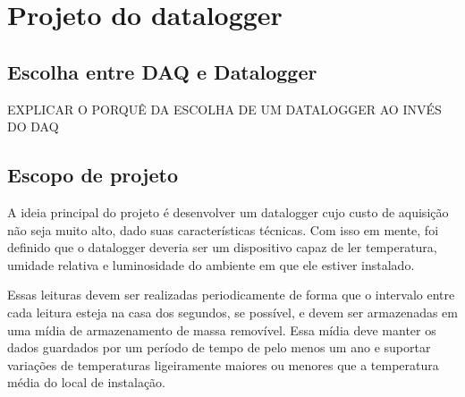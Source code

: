 \chapter{Projeto do datalogger}
\label{chap:metodologia}


\section{Escolha entre DAQ e Datalogger}




EXPLICAR O PORQUÊ DA ESCOLHA DE UM DATALOGGER AO INVÉS DO DAQ




\section{Escopo de projeto}




A ideia principal do projeto é desenvolver um datalogger cujo custo de aquisição não seja muito alto, dado suas características técnicas. Com isso em mente, foi definido que o datalogger deveria ser um dispositivo capaz de ler temperatura, umidade relativa e luminosidade do ambiente em que ele estiver instalado. 

Essas leituras devem ser realizadas periodicamente de forma que o intervalo entre cada leitura esteja na casa dos segundos, se possível, e devem ser armazenadas em uma mídia de armazenamento de massa removível. Essa mídia deve manter os dados guardados por um período de tempo  de pelo menos um ano e suportar variações de temperaturas ligeiramente maiores ou menores que a temperatura média do local de instalação.



